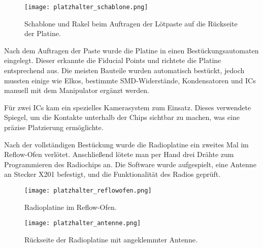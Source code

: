 \begin{figure}[h!]
    \centering
    \texttt{[image: platzhalter\_schablone.png]}
    \caption{Schablone und Rakel beim Auftragen der Lötpaste auf die Rückseite der Platine.}
    \label{fig:schablone}
\end{figure}

Nach dem Auftragen der Paste wurde die Platine in einen Bestückungsautomaten eingelegt. Dieser erkannte die Fiducial Points und richtete die Platine entsprechend aus. Die meisten Bauteile wurden automatisch bestückt, jedoch mussten einige wie Elkos, bestimmte SMD-Widerstände, Kondensatoren und ICs manuell mit dem Manipulator ergänzt werden.

Für zwei ICs kam ein spezielles Kamerasystem zum Einsatz. Dieses verwendete Spiegel, um die Kontakte unterhalb der Chips sichtbar zu machen, was eine präzise Platzierung ermöglichte.

Nach der vollständigen Bestückung wurde die Radioplatine ein zweites Mal im Reflow-Ofen verlötet. Anschließend lötete man per Hand drei Drähte zum Programmieren des Radiochips an. Die Software wurde aufgespielt, eine Antenne an Stecker X201 befestigt, und die Funktionalität des Radios geprüft.

\begin{figure}[h!]
    \centering
    \texttt{[image: platzhalter\_reflowofen.png]}
    \caption{Radioplatine im Reflow-Ofen.}
    \label{fig:reflowofen}
\end{figure}

\begin{figure}[h!]
    \centering
    \texttt{[image: platzhalter\_antenne.png]}
    \caption{Rückseite der Radioplatine mit angeklemmter Antenne.}
    \label{fig:antenne}
\end{figure}

